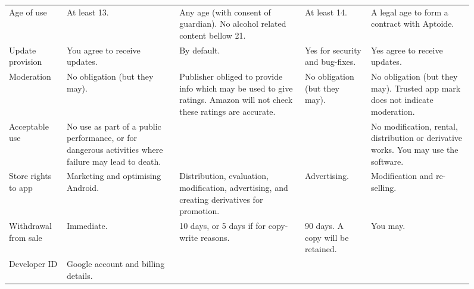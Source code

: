 \documentclass[a4paper]{scrartcl}
\begin{document}
\begin{figure}[!h]
\begin{tabulary}{\linewidth}{lLLLL}
Age of use           & At least 13.
                     & Any age (with consent of guardian).  No alcohol related content bellow 21.
                     & At least 14.
                     & A legal age to form a contract with Aptoide.                                                                                                                      \\ \addlinespace
Update provision     & You agree to receive updates.
                     & By default.
                     & Yes for security and bug-fixes.
                     & Yes agree to receive updates.                                                                                                                                     \\ \addlinespace
Moderation           & No obligation (but they may).
                     & Publisher obliged to provide info which may be used to give ratings.  Amazon will not check these ratings are accurate.
                     & No obligation (but they may).
                     & No obligation (but they may).  Trusted app mark does not indicate moderation.                                                                                     \\ \addlinespace
Acceptable use       & No use as part of a public performance, or for dangerous activities where failure may lead to death.
                     &
                     &
                     & No modification, rental, distribution or derivative works.  You may use the software.                                                                             \\ \addlinespace
Store rights to app  & Marketing and optimising Android.
                     & Distribution, evaluation, modification, advertising, and creating derivatives for promotion.
                     & Advertising.
                     & Modification and re-selling.                                                                                                                                      \\ \addlinespace
Withdrawal from sale & Immediate.
                     & 10 days, or 5 days if for copy-write reasons.
                     & 90 days. A copy will be retained.
                     & You may.                                                                                                                                                          \\ \addlinespace
Developer ID         & Google account and billing details.

\end{tabulary}
\end{figure}
\end{document}
